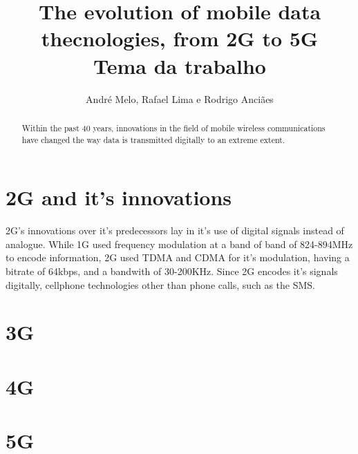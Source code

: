 \documentclass{article}
\title{The evolution of mobile data thecnologies, from 2G to 5G\\
	\large Tema da trabalho \\}
\author{André Melo, Rafael Lima e Rodrigo Anciães}
\begin{document}
\maketitle
\begin{abstract}
Within the past 40 years, innovations in the field of mobile wireless communications have changed the way data is transmitted digitally to an extreme extent.   
\end{abstract}
\pagebreak

\section{2G and it's innovations}
2G's innovations over it's predecessors lay in it's use of digital signals instead of analogue. While 1G used frequency modulation at a band of band of 824-894MHz to encode information, 2G used TDMA and CDMA for it's modulation, having a bitrate of 64kbps, and a bandwith of 30-200KHz. Since 2G encodes it's signals digitally, cellphone technologies other than phone calls, such as the SMS.

\section{3G}

\section{4G}

\section{5G}
\end{document}
